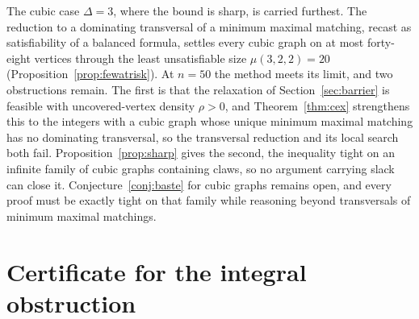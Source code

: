 \documentclass[11pt]{article}
\theoremstyle{definition}
\theoremstyle{remark}
\begin{document}
The cubic case
$\Delta = 3$, where the bound is sharp, is carried furthest. The reduction to a
dominating transversal of a minimum maximal matching, recast as satisfiability of
a balanced formula, settles every cubic graph on at most forty-eight vertices
through the least unsatisfiable size $\mu(3,2,2) = 20$
(Proposition~\ref{prop:fewatrisk}). At $n = 50$ the method meets its limit, and
two obstructions remain. The first is that the relaxation of
Section~\ref{sec:barrier} is feasible with uncovered-vertex density $\rho > 0$,
and Theorem~\ref{thm:cex} strengthens
this to the integers with a cubic graph whose unique minimum maximal matching has
no dominating transversal, so the transversal reduction and its local search both
fail. Proposition~\ref{prop:sharp} gives the second, the inequality tight on an
infinite family of cubic graphs containing claws, so no argument carrying slack
can close it. Conjecture~\ref{conj:baste} for cubic graphs remains open, and every
proof must be exactly tight on that family while reasoning beyond transversals of
minimum maximal matchings.

\appendix

\section{Certificate for the integral obstruction}\label{app:cert}
\end{document}
